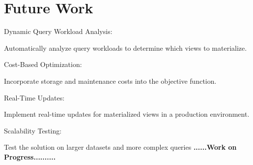 
\section{Future Work}
Dynamic Query Workload Analysis:

Automatically analyze query workloads to determine which views to materialize.

Cost-Based Optimization:

Incorporate storage and maintenance costs into the objective function.

Real-Time Updates:

Implement real-time updates for materialized views in a production environment.

Scalability Testing:

Test the solution on larger datasets and more complex queries
\textbf{......\textbf{Work on Progress}..........}       